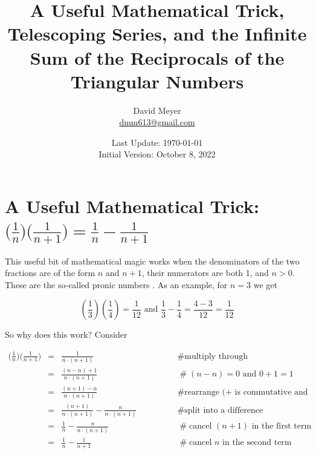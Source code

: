 \documentclass{article}
\title{A Useful Mathematical Trick, Telescoping Series, and the 
       Infinite Sum of the Reciprocals of the Triangular Numbers}
\author{David Meyer \\ \href{mailto:dmm613@gmail.com}
                            {dmm613@gmail.com}}
\date{Last Update: \today \\
	 {\vspace{1.00mm} \small Initial Version: October 8, 2022}}
\theoremstyle{definition}
\begin{document}
\maketitle
%
%
%
%
\section{A Useful Mathematical Trick: 
		$\Big ( \frac{1}{n} \Big ) \Big ( \frac{1}{n+1} \Big ) = 
		\frac{1}{n} - \frac{1}{n+1}$}
\label{a_equals_b_equals_1}
This useful bit of mathematical magic works when the denominators
of the two fractions are of the form $n$ and $n+1$, their
numerators are both 1, and $n > 0$.  These are the so-called
pronic numbers \cite{wiki:pronic_numbers}. As an example, for 
$n = 3$ we get

\bigskip
\begin{equation*}
\left (\frac{1}{3} \right ) \left ( \frac{1}{4} \right ) =
\frac{1}{12} \text{ and } \frac{1}{3} -  \frac{1}{4} = \frac{4
-3}{12} =  \frac{1}{12}  
\end{equation*}

\bigskip
\noindent
So why does this work? Consider


\begin{equation*}
\begin{array}{lllll}
{\displaystyle \bigg ( \frac{1}{n} \bigg ) \bigg ( \frac{1}{n+1} \bigg )}              
&=& {\displaystyle \frac{1}{n \cdot (n+1)}}
                &\qquad \qquad \mathrel{\#} \text{multiply through} \\
[15pt]
&=& {\displaystyle \frac{(n-n) + 1}{n \cdot(n+1)}}
                &\qquad \qquad \mathrel{\#} \text{$(n-n) = 0$ and  $0+1 = 1$} \\
[15pt]
&=& {\displaystyle \frac{(n+1) - n}{n \cdot (n+1)}}
                &\qquad \qquad \mathrel{\#} \text{rearrange (+ is commutative and associative)} \\
[15pt]
&=& {\displaystyle \frac{(n+1)}{n \cdot (n+1)} - \frac{n}{n \cdot
(n+1)}}
                &\qquad \qquad \mathrel{\#} \text{split into a difference} \\
[15pt]
&=& {\displaystyle \frac{1}{n} - \frac{n}{n \cdot (n+1)}}
                &\qquad \qquad \mathrel{\#} \text{cancel $(n+1)$ in the first term} \\
[15pt]
&=& {\displaystyle \frac{1}{n} - \frac{1}{n+1}}
                &\qquad \qquad \mathrel{\#} \text{cancel $n$ in the second term} 
\end{array}
\end{equation*}
\end{document}

